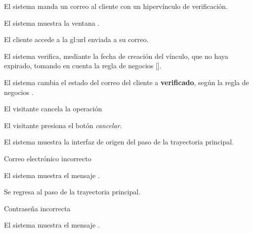 {\begin{trayectoriaPrincipal}
      \item El sistema manda un correo al cliente con un hipervínculo de
        verificación.

      \item El sistema muestra la ventana
        .

      \item El cliente accede a la \gls{gl:url} enviada a su correo.

      \item El sistema verifica, mediante la fecha de creación del vínculo, que no
        haya expirado, tomando en cuenta la regla de negocios
        [].

      \item El sistema cambia el estado del correo del cliente a \textbf{verificado},
        según la regla de negocios .

  \end{trayectoriaPrincipal}

  \begin{trayectoriaAlternativa}[ta:cancelar]
    {El visitante cancela la operación}

    \item El visitante presiona el botón \textit{cancelar}.

    \item El sistema muestra la interfaz de origen del paso
       de la trayectoria principal.

  \end{trayectoriaAlternativa}

  \begin{trayectoriaAlternativa}
    {Correo electrónico incorrecto}

    \item El sistema muestra el mensaje .

    \item Se regresa al paso  de la trayectoria
      principal.

  \end{trayectoriaAlternativa}

  \begin{trayectoriaAlternativa}
    {Contraseña incorrecta}

    \item El sistema muestra el mensaje
      .


\end{trayectoriaAlternativa}}
